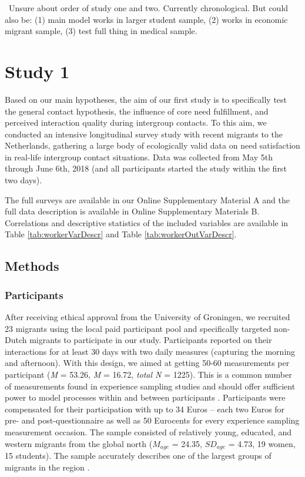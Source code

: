 \faQuestionCircle~Unsure about order of study one and two. Currently
chronological. But could also be: (1) main model works in larger student
sample, (2) works in economic migrant sample, (3) test full thing in
medical sample.

\section{Study 1}

Based on our main hypotheses, the aim of our first study is to
specifically test the general contact hypothesis, the influence of core
need fulfillment, and perceived interaction quality during intergroup
contacts. To this aim, we conducted an intensive longitudinal survey
study with recent migrants to the Netherlands, gathering a large body of
ecologically valid data on need satisfaction in real-life intergroup
contact situations. Data was collected from May 5th through June 6th,
2018 (and all participants started the study within the first two days).

The full surveys are available in our Online Supplementary Material A
and the full data description is available in Online Supplementary
Materials B. Correlations and descriptive statistics of the included
variables are available in Table \ref{tab:workerVarDescr} and Table
\ref{tab:workerOutVarDescr}.

\subsection{Methods}

\subsubsection{Participants}

After receiving ethical approval from the University of Groningen, we
recruited 23 migrants using the local paid participant pool and
specifically targeted non-Dutch migrants to participate in our study.
Participants reported on their interactions for at least 30 days with
two daily measures (capturing the morning and afternoon). With this
design, we aimed at getting 50-60 measurements per participant
(\textit{M} = 53.26, \textit{M} = 16.72, \textit{total N} = 1225). This
is a common number of measurements found in experience sampling studies
and should offer sufficient power to model processes within and between
participants \citep[e.g., for a systematic review see][]{AanhetRot2012}.
Participants were compensated for their participation with up to 34
Euros -- each two Euros for pre- and post-questionnaire as well as 50
Eurocents for every experience sampling measurement occasion. The sample
consisted of relatively young, educated, and western migrants from the
global north (\(M_{age}\) = 24.35, \(SD_{age}\) = 4.73, 19 women, 15
students). The sample accurately describes one of the largest groups of
migrants in the region \citep[][]{GemeenteGroningen2015}.

